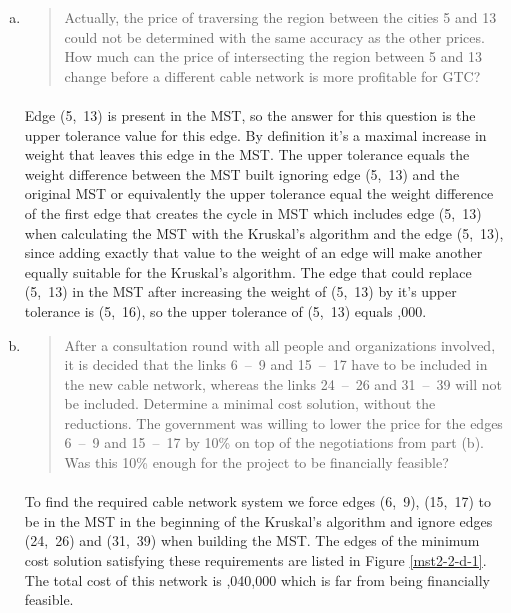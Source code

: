 \begin{enumerate}[(a)]
\item \begin{quote}Actually, the price of traversing the region between the cities 5 and 13 could not
be determined with the same accuracy as the other prices. How much can the
price of intersecting the region between 5 and 13 change before a different cable
network is more profitable for GTC?\end{quote}

	\paragraph{}
	Edge (5,~13) is present in the MST, so the answer for this question is the upper tolerance value for this edge. By definition it's a maximal increase in weight that leaves this edge in the MST. The upper tolerance equals the weight difference between  the MST built ignoring edge (5,~13) and the original MST or equivalently the upper tolerance equal the weight difference of the first edge that creates the cycle in MST which includes edge (5,~13) when calculating the MST with the Kruskal's algorithm and the edge (5,~13), since adding exactly that value to the weight of an edge will make another equally suitable for the Kruskal's algorithm. The edge that could replace (5,~13) in the MST after increasing the weight of (5,~13) by it's upper tolerance is (5,~16), so the upper tolerance of (5,~13) equals ,000.

\item \begin{quote}After a consultation round with all people and organizations involved, it is decided
that the links 6~--~9 and 15~--~17 have to be included in the new cable
network, whereas the links 24~--~26 and 31~--~39 will not be included. Determine
a minimal cost solution, without the reductions.
The government was willing to lower the price for the edges 6~--~9 and 15~--~17
by 10\% on top of the negotiations from part (b). Was this 10\% enough for the
project to be financially feasible?\end{quote}

	\paragraph{}
	To find the required cable network system we force edges (6,~9), (15,~17) to be in the MST in the beginning of the Kruskal's algorithm and ignore edges (24,~26) and (31,~39) when building the MST. The edges of the minimum cost solution satisfying these requirements are listed in Figure \ref{mst2-2-d-1}. The total cost of this network is ,040,000 which is far from being financially feasible.


\end{enumerate}
